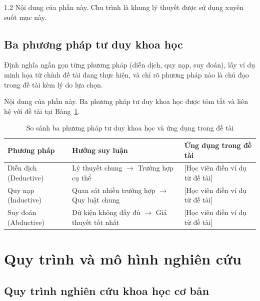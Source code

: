 \begin{spacing}{1.2}
Nội dung của phần này. Chu trình  là khung lý thuyết được sử dụng xuyên suốt mục này.

\subsection{Ba phương pháp tư duy khoa học}
\label{subsec:tu_duy}

\begin{huongdan}
Định nghĩa ngắn gọn từng phương pháp (diễn dịch, quy nạp, suy đoán), lấy ví dụ minh họa từ chính đề tài đang thực hiện, và chỉ rõ phương pháp nào là chủ đạo trong đề tài kèm lý do lựa chọn.
\end{huongdan}

Nội dung của phần này. Ba phương pháp tư duy khoa học được tóm tắt và liên hệ với đề tài tại Bảng~\ref{tab:tu_duy}.

\begin{table}[htpb]
\centering
\caption{So sánh ba phương pháp tư duy khoa học và ứng dụng trong đề tài}
\label{tab:tu_duy}
\renewcommand{\arraystretch}{1.3}
{\fontsize{12}{14}\selectfont
\begin{tabularx}{\textwidth}{|>{\raggedright\arraybackslash}p{3.2cm}|>{\raggedright\arraybackslash}p{4.6cm}|X|}
\hline
\textbf{Phương pháp} & \textbf{Hướng suy luận} & \textbf{Ứng dụng trong đề tài} \\
\hline
Diễn dịch (Deductive) & Lý thuyết chung $\rightarrow$ Trường hợp cụ thể & [Học viên điền ví dụ từ đề tài] \\
\hline
Quy nạp (Inductive) & Quan sát nhiều trường hợp $\rightarrow$ Quy luật chung & [Học viên điền ví dụ từ đề tài] \\
\hline
Suy đoán (Abductive) & Dữ kiện không đầy đủ $\rightarrow$ Giả thuyết tốt nhất & [Học viên điền ví dụ từ đề tài] \\
\hline
\end{tabularx}
}
\end{table}

\section{Quy trình và mô hình nghiên cứu}
\label{sec:quy_trinh_mo_hinh}

\subsection{Quy trình nghiên cứu khoa học cơ bản}
\label{subsec:quy_trinh}


\end{spacing}
